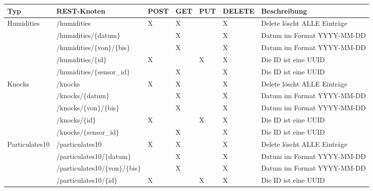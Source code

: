 \begin{landscape}
  \begin{table}[H]
    \begin{longtable}{lllllll}
      \textbf{Typ} & \textbf{REST-Knoten} & \textbf{POST} & \textbf{GET} & \textbf{PUT} & \textbf{DELETE} & \textbf{Beschreibung} \\ \toprule
      \multirow{5}{*}{Humidities}     & /humidities                   & X & X & & X & Delete löscht ALLE Einträge   \\
                                      & /humidities/$\{$datum$\}$           &  & X & & X & Datum im Format YYYY-MM-DD     \\
                                      & /humidities/$\{$von$\}$/$\{$bis$\}$       &  & X & & X & Datum im Format YYYY-MM-DD     \\
                                      & /humidities/$\{$id$\}$              & X & & X & X & Die ID ist eine UUID          \\
                                      & /humidities/$\{$sensor\_id$\}$      &  & X & & X & Die ID ist eine UUID           \\ \midrule
      \multirow{5}{*}{Knocks}         & /knocks                       & X & X & & X & Delete löscht ALLE Einträge   \\
                                      & /knocks/$\{$datum$\}$               &  & X & & X & Datum im Format YYYY-MM-DD     \\
                                      & /knocks/$\{$von$\}$/$\{$bis$\}$           &  & X & & X & Datum im Format YYYY-MM-DD     \\
                                      & /knocks/$\{$id$\}$                  & X & & X & X & Die ID ist eine UUID          \\
                                      & /knocks/$\{$sensor\_id$\}$          &  & X & & X & Die ID ist eine UUID           \\ \midrule
      \multirow{5}{*}{Particulates10} & /particulates10               & X & X & & X & Delete löscht ALLE Einträge   \\
                                      & /particulates10/$\{$datum$\}$       &  & X & & X & Datum im Format YYYY-MM-DD     \\
                                      & /particulates10/$\{$von$\}$/$\{$bis$\}$   &  & X & & X & Datum im Format YYYY-MM-DD     \\
                                      & /particulates10/$\{$id$\}$          & X & & X & X & Die ID ist eine UUID          \\

\end{longtable}
\end{table}
\end{landscape}

